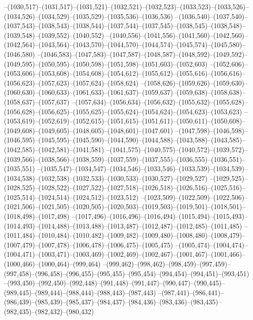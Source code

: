 --(1030,517)--(1031,517)--(1031,521)--(1032,521)--(1032,523)--(1033,523)--(1033,526)--(1034,526)--(1034,529)--(1035,529)--(1035,536)--(1036,536)
--(1036,540)--(1037,540)--(1037,543)--(1038,543)--(1038,544)--(1037,544)--(1037,545)--(1038,545)--(1038,548)--(1039,548)--(1039,552)--(1040,552)
--(1040,556)--(1041,556)--(1041,560)--(1042,560)--(1042,564)--(1043,564)--(1043,570)--(1044,570)--(1044,574)--(1045,574)--(1045,580)--(1046,580)
--(1046,583)--(1047,583)--(1047,587)--(1048,587)--(1048,592)--(1049,592)--(1049,595)--(1050,595)--(1050,598)--(1051,598)--(1051,603)--(1052,603)
--(1052,606)--(1053,606)--(1053,608)--(1054,608)--(1054,612)--(1055,612)--(1055,616)--(1056,616)--(1056,623)--(1057,623)--(1057,624)--(1058,624)
--(1058,626)--(1059,626)--(1059,630)--(1060,630)--(1060,633)--(1061,633)--(1061,637)--(1059,637)--(1059,638)--(1058,638)--(1058,637)--(1057,637)
--(1057,634)--(1056,634)--(1056,632)--(1055,632)--(1055,628)--(1056,628)--(1056,625)--(1055,625)--(1055,624)--(1054,624)--(1054,623)--(1053,623)
--(1053,619)--(1052,619)--(1052,615)--(1051,615)--(1051,611)--(1050,611)--(1050,608)--(1049,608)--(1049,605)--(1048,605)--(1048,601)--(1047,601)
--(1047,598)--(1046,598)--(1046,595)--(1045,595)--(1045,590)--(1044,590)--(1044,588)--(1043,588)--(1043,585)--(1042,585)--(1042,581)--(1041,581)
--(1041,575)--(1040,575)--(1040,572)--(1039,572)--(1039,566)--(1038,566)--(1038,559)--(1037,559)--(1037,555)--(1036,555)--(1036,551)--(1035,551)
--(1035,547)--(1034,547)--(1034,546)--(1033,546)--(1033,539)--(1034,539)--(1034,538)--(1032,538)--(1032,533)--(1030,533)--(1030,527)--(1029,527)
--(1029,525)--(1028,525)--(1028,522)--(1027,522)--(1027,518)--(1026,518)--(1026,516)--(1025,516)--(1025,514)--(1024,514)--(1024,512)--(1023,512)
--(1023,509)--(1022,509)--(1022,506)--(1021,506)--(1021,505)--(1020,505)--(1020,503)--(1019,503)--(1019,501)--(1018,501)--(1018,498)--(1017,498)
--(1017,496)--(1016,496)--(1016,494)--(1015,494)--(1015,493)--(1014,493)--(1014,488)--(1013,488)--(1013,487)--(1012,487)--(1012,485)--(1011,485)
--(1011,484)--(1010,484)--(1010,482)--(1009,482)--(1009,480)--(1008,480)--(1008,479)--(1007,479)--(1007,478)--(1006,478)--(1006,475)--(1005,475)
--(1005,474)--(1004,474)--(1004,471)--(1003,471)--(1003,469)--(1002,469)--(1002,467)--(1001,467)--(1001,466)--(1000,466)--(1000,464)--(999,464)
--(999,462)--(998,462)--(998,459)--(997,459)--(997,458)--(996,458)--(996,455)--(995,455)--(995,454)--(994,454)--(994,451)--(993,451)
--(993,450)--(992,450)--(992,448)--(991,448)--(991,447)--(990,447)--(990,445)--(989,445)--(989,444)--(988,444)--(988,443)--(987,443)
--(987,441)--(986,441)--(986,439)--(985,439)--(985,437)--(984,437)--(984,436)--(983,436)--(983,435)--(982,435)--(982,432)--(980,432)
